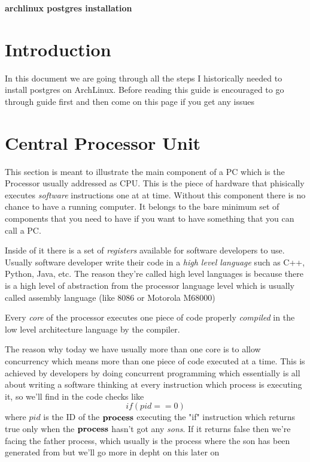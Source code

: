 \documentclass[a4paper,12pt]{article}
\begin{document}
\textbf{archlinux postgres installation}
\tableofcontents

\section{Introduction}

In this document we are going through all the steps I historically needed to install postgres on ArchLinux. Before reading this guide is encouraged to go through \href{https://github.com/danieledellacioppa/ACL-Assignments/blob/main/Matthew%20Gillman/archlinux-postgres/one-step-installation/README.md} guide first and then come on this page if you get any issues


\clearpage

\section{Central Processor Unit}
This section is meant to illustrate the main component of a PC 
which is the Processor usually addressed as CPU.
This is the piece of hardware that phisically executes \emph{software} instructions one at at time.
Without this component there is no chance to have a running computer. It belongs to the bare minimum set of 
components that you need to have if you want to have something that you can call a PC.

Inside of it there is a set of \emph{registers} available for software developers to use.
Usually software developer write their code in a \emph{high level language} such as C++, Python, Java, etc.
The reason they're called high level languages is because there is a high level of abstraction from the processor
language level which is usually called assembly language (like 8086 or Motorola M68000)

Every \emph{core} of the processor executes one piece of code properly \emph {compiled} in the low level architecture
language by the compiler.

The reason why today we have usually more than one core is to allow concurrency which means more than one piece of
code executed at a time. This is achieved by developers by doing concurrent programming which essentially is all about
writing a software thinking at every instruction which process is executing it, so we'll find in the code checks like
\[if (pid==0)\]
where $pid$ is the ID of the $\bf process$ executing the "if" instruction which returns true only when the $\bf process$ hasn't  got any \emph{sons}. If it returns false then we're facing the father process, which usually is the process where the son has been generated from but
we'll go more in depht on this later on
\end{document}
